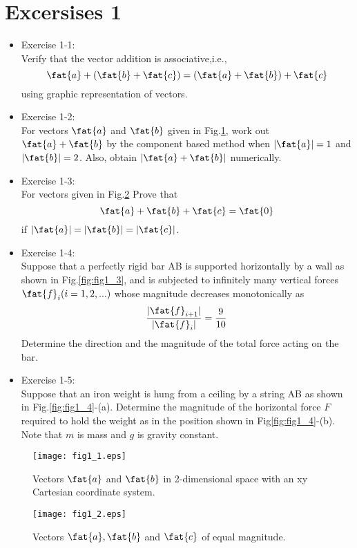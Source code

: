 \section*{Excersises 1}
\begin{itemize}
\item
Exercise 1-1:\\
Verify that the vector addition is associative,i.e., 
\[
	\fat{a}+(\fat{b}+\fat{c})=
		(\fat{a}+\fat{b})+\fat{c}
\]
using graphic representation of vectors. 
\item
Exercise 1-2:\\
For vectors $\fat{a}$ and $\fat{b}$ given in Fig.\ref{fig:fig1_1}, 
work out $\fat{a}+\fat{b}$ by the component based 
		method when  $|\fat{a}|=1$ and $|\fat{b}|=2$.
		Also, obtain $|\fat{a}+\fat{b}|$ numerically.
\item
Exercise 1-3:\\
		For vectors given in Fig.\ref{fig:fig1_2} Prove that 
	\[
		\fat{a}+\fat{b}+\fat{c}=\fat{0}
	\]
		if $|\fat{a}|=|\fat{b}|=|\fat{c}|$.
\item
Exercise 1-4:\\
Suppose that a perfectly rigid bar AB is supported horizontally by a wall
 as shown in Fig.\ref{fig:fig1_3}, and is subjected to infinitely many 
vertical forces $\fat{f}_i (i=1,2,...)$ whose magnitude decreases monotonically as 
\[
 \frac{
	|\fat{f}_{i+1}|
	}{
	|\fat{f}_i|
}
	=\frac{9}{10} 
\]
Determine the direction and the magnitude of the total force acting on the bar. 
\item
Exercise 1-5:\\
	Suppose that an iron weight is hung from a ceiling by a string AB as shown in Fig.\ref{fig:fig1_4}-(a). 
	Determine the magnitude of the horizontal force $F$ required to hold the weight as 
	in the position shown in Fig\ref{fig:fig1_4}-(b).
	Note that $m$ is mass and $g$ is gravity constant.  
\end{itemize}
\begin{figure}[h]
	\begin{center}
	\texttt{[image: fig1\_1.eps]} 
	\end{center}
	\caption{Vectors $\fat{a}$ and $\fat{b}$ in 2-dimensional space with an
	xy Cartesian coordinate system.}
	\label{fig:fig1_1}
\end{figure}
\begin{figure}[h]
	\begin{center}
	\texttt{[image: fig1\_2.eps]} 
	\end{center}
	\caption{Vectors $\fat{a}, \fat{b}$ and $\fat{c}$ of equal magnitude.} 
	\label{fig:fig1_2}
\end{figure}
